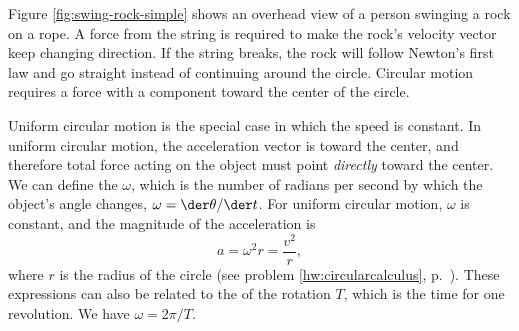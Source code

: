 Figure \ref{fig:swing-rock-simple} shows an overhead view of a person
swinging a rock on a rope. A force from the string is required to make
the rock's velocity vector keep changing direction.  If the string
breaks, the rock will follow Newton's first law and go straight
instead of continuing around the circle. Circular motion requires
a force with a component toward the center of the circle.


Uniform circular motion is the special case in which the speed is constant.
In uniform circular motion, the acceleration vector is toward the
center, and therefore total force acting on the object
must point \emph{directly} toward the center. We can define the
 $\omega$, which is the number of radians per second
by which the object's angle changes, $\omega=\der\theta/\der t$.
For uniform circular motion, $\omega$ is constant, and the magnitude of the acceleration is
\begin{equation}
  a = \omega^2 r = \frac{v^2}{r},
\end{equation}
where $r$ is the radius of the circle (see problem \ref{hw:circularcalculus},
p.~\pageref{hw:circularcalculus}). These expressions can also be related
to the  of the rotation $T$, which is the time for
one revolution. We have $\omega=2\pi/T$.
